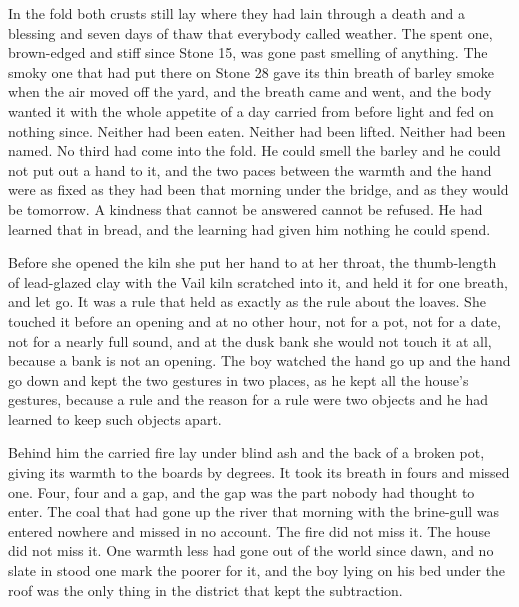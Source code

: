 In the fold both crusts still lay where they had lain through a death and a blessing and seven days of thaw that everybody called weather. The spent one, brown-edged and stiff since Stone 15, was gone past smelling of anything. The smoky one that  had put there on Stone 28 gave its thin breath of barley smoke when the air moved off the yard, and the breath came and went, and the body wanted it with the whole appetite of a day carried from before light and fed on nothing since. Neither had been eaten. Neither had been lifted. Neither had been named. No third had come into the fold. He could smell the barley and he could not put out a hand to it, and the two paces between the warmth and the hand were as fixed as they had been that morning under the bridge, and as they would be tomorrow. A kindness that cannot be answered cannot be refused. He had learned that in bread, and the learning had given him nothing he could spend.

Before she opened the kiln she put her hand to  at her throat, the thumb-length of lead-glazed clay with the Vail kiln scratched into it, and held it for one breath, and let go. It was a rule that held as exactly as the rule about the loaves. She touched it before an opening and at no other hour, not for a pot, not for a date, not for a nearly full sound, and at the dusk bank she would not touch it at all, because a bank is not an opening. The boy watched the hand go up and the hand go down and kept the two gestures in two places, as he kept all the house's gestures, because a rule and the reason for a rule were two objects and he had learned to keep such objects apart.

Behind him the carried fire lay under blind ash and the back of a broken pot, giving its warmth to the boards by degrees. It took its breath in fours and missed one. Four, four and a gap, and the gap was the part nobody had thought to enter. The coal that had gone up the river that morning with the brine-gull was entered nowhere and missed in no account. The fire did not miss it. The house did not miss it. One warmth less had gone out of the world since dawn, and no slate in  stood one mark the poorer for it, and the boy lying on his bed under the roof was the only thing in the district that kept the subtraction.

\scenebreak

